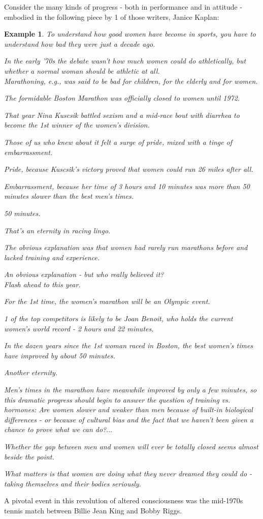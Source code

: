 \documentclass{book}
\numberwithin{equation}{section}
\newtheorem{example}{Example}[chapter]
\begin{document}
Consider the many kinds of progress - both in performance and in attitude - embodied in the following piece by 1 of those writers, Janice Kaplan:
\begin{example}
    To understand how good women have become in sports, you have to understand how bad they were just a decade ago.
    
    In the early '70s the debate wasn't how much women could do athletically, but whether a normal woman should be athletic at all.
    \\
    
    Marathoning, e.g., was said to be bad for children, for the elderly and for women.
    
    The formidable Boston Marathon was officially closed to women until 1972.
    
    That year Nina Kuscsik battled sexism and a mid-race bout with diarrhea to become the 1st winner of the women's division.
    
    Those of us who knew about it felt a surge of pride, mixed with a tinge of embarrassment.
    
    Pride, because Kuscsik's victory proved that women could run 26 miles after all.
    
    Embarrassment, because her time of 3 hours and 10 minutes was more than 50 minutes slower than the best men's times.
    
    50 minutes.
    
    That's an eternity in racing lingo.
    
    The obvious explanation was that women had rarely run marathons before and lacked training and experience.
    
    An obvious explanation - but who really believed it?
    \\
    
    Flash ahead to this year.
    
    For the 1st time, the women's marathon will be an Olympic event.
    
    1 of the top competitors is likely to be Joan Benoit, who holds the current women's world record - 2 hours and 22 minutes.
    
    In the dozen years since the 1st woman raced in Boston, the best women's times have improved by about 50 minutes.
    
    Another eternity.
    
    Men's times in the marathon have meanwhile improved by only a few minutes, so this dramatic progress should begin to answer the question of training vs. hormones: Are women slower and weaker than men because of built-in biological differences - or because of cultural bias and the fact that we haven't been given a chance to prove what we can do?$\ldots$
    
    Whether the gap between men and women will ever be totally closed seems almost beside the point.
    
    What matters is that women are doing what they never dreamed they could do - taking themselves and their bodies seriously.
\end{example}
A pivotal event in this revolution of altered consciousness was the mid-1970s tennis match between Billie Jean King and Bobby Riggs.
\end{document}
